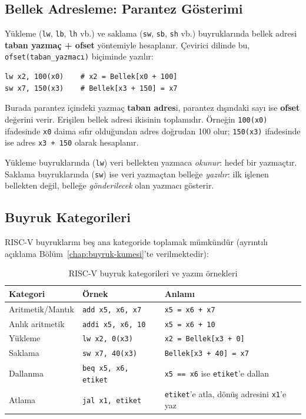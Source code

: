 \subsection{Bellek Adresleme: Parantez Gösterimi}

Yükleme (\texttt{lw}, \texttt{lb}, \texttt{lh} vb.) ve saklama (\texttt{sw}, \texttt{sb}, \texttt{sh} vb.) buyruklarında bellek adresi \textbf{taban yazmaç + ofset} yöntemiyle hesaplanır. Çevirici dilinde bu, \texttt{ofset(taban\_yazmacı)} biçiminde yazılır:

\begin{lstlisting}[style=riscv, style=alistirma-kod]
lw x2, 100(x0)    # x2 = Bellek[x0 + 100]
sw x7, 150(x3)    # Bellek[x3 + 150] = x7
\end{lstlisting}

Burada parantez içindeki yazmaç \textbf{taban adres}i, parantez dışındaki sayı ise \textbf{ofset} değerini verir. Erişilen bellek adresi ikisinin toplamıdır. Örneğin \texttt{100(x0)} ifadesinde \texttt{x0} daima sıfır olduğundan adres doğrudan 100 olur; \texttt{150(x3)} ifadesinde ise adres \texttt{x3 + 150} olarak hesaplanır.

\begin{bilginot}
Yükleme buyruklarında (\texttt{lw}) veri bellekten yazmaca \emph{okunur}: hedef bir yazmaçtır. Saklama buyruklarında (\texttt{sw}) ise veri yazmaçtan belleğe \emph{yazılır}: ilk işlenen bellekten değil, belleğe \emph{gönderilecek} olan yazmacı gösterir.
\end{bilginot}

\subsection{Buyruk Kategorileri}

RISC-V buyruklarını beş ana kategoride toplamak mümkündür (ayrıntılı açıklama Bölüm~\ref{chap:buyruk-kumesi}'te verilmektedir):

\begin{table}[H]
\centering
\caption{RISC-V buyruk kategorileri ve yazım örnekleri}
\label{tab:ekc-buyruk-kategorileri}
\begin{tabular}{lll}
\toprule
\textbf{Kategori} & \textbf{Örnek} & \textbf{Anlamı} \\
\midrule
Aritmetik/Mantık & \texttt{add x5, x6, x7} & \texttt{x5 = x6 + x7} \\
Anlık aritmetik  & \texttt{addi x5, x6, 10} & \texttt{x5 = x6 + 10} \\
Yükleme          & \texttt{lw x2, 0(x3)} & \texttt{x2 = Bellek[x3 + 0]} \\
Saklama          & \texttt{sw x7, 40(x3)} & \texttt{Bellek[x3 + 40] = x7} \\
Dallanma         & \texttt{beq x5, x6, etiket} & \texttt{x5 == x6} ise \texttt{etiket}'e dallan \\
Atlama           & \texttt{jal x1, etiket} & \texttt{etiket}'e atla, dönüş adresini \texttt{x1}'e yaz \\
\bottomrule
\end{tabular}
\end{table}

